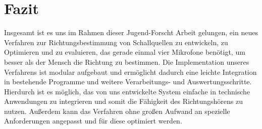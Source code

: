 \section{Fazit}
Insgesamt ist es uns im Rahmen dieser Jugend-Forscht Arbeit gelungen, ein neues Verfahren zur Richtungsbestimmung von Schallquellen zu entwickeln, zu Optimieren und zu evaluieren, das gerade einmal vier Mikrofone benötigt, um besser als der Mensch die Richtung zu bestimmen. Die Implementation unseres Verfahrens ist modular aufgebaut und ermöglicht dadurch eine leichte Integration in bestehende Programme und weitere Verarbeitungs- und Auswertungsschritte. Hierdurch ist es möglich, das von uns entwickelte System einfache in technische Anwendungen zu integrieren und somit die Fähigkeit des Richtungshörens zu nutzen. Außerdem kann das Verfahren ohne großen Aufwand an spezielle Anforderungen angepasst und für diese optimiert werden.